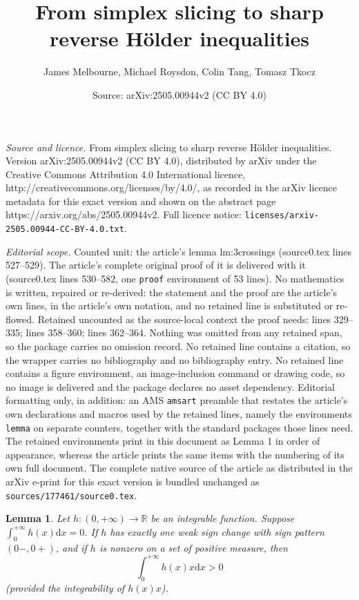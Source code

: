 \documentclass[10pt,a4paper]{amsart}
\title{From simplex slicing to sharp reverse H\"older inequalities}
\author{James Melbourne, Michael Roysdon, Colin Tang, Tomasz Tkocz}
\date{Source: arXiv:2505.00944v2 (CC BY 4.0)}
\newtheorem{lemma}{Lemma}
\newcommand{\R}{\mathbb{R}}
\newcommand{\dd}{\mathrm{d}}
\begin{document}
\maketitle

\noindent\emph{Source and licence.} From simplex slicing to sharp reverse H\"older inequalities. Version arXiv:2505.00944v2 (CC BY 4.0), distributed by arXiv under the Creative Commons Attribution 4.0 International licence, http://creativecommons.org/licenses/by/4.0/, as recorded in the arXiv licence metadata for this exact version and shown on the abstract page https://arxiv.org/abs/2505.00944v2. Full licence notice: \texttt{licenses/arxiv-2505.00944-CC-BY-4.0.txt}.\par\smallskip

\noindent\textit{Editorial scope.} Counted unit: the article's lemma lm:3crossings (source0.tex lines 527--529). The article's complete original proof of it is delivered with it (source0.tex lines 530--582, one \texttt{proof} environment of 53 lines). No mathematics is written, repaired or re-derived: the statement and the proof are the article's own lines, in the article's own notation, and no retained line is substituted or re-flowed.  Retained uncounted as the source-local context the proof needs: lines 329--335; lines 358--360; lines 362--364.  Nothing was omitted from any retained span, so the package carries no omission record.  No retained line contains a citation, so the wrapper carries no bibliography and no bibliography entry.  No retained line contains a figure environment, an image-inclusion command or drawing code, so no image is delivered and the package declares no asset dependency.  Editorial formatting only, in addition: an AMS \texttt{amsart} preamble that restates the article's own declarations and macros used by the retained lines, namely the environments \texttt{lemma} on separate counters, together with the standard packages those lines need.  The retained environments print in this document as Lemma 1 in order of appearance, whereas the article prints the same items with the numbering of its own full document.  The complete native source of the article as distributed in the arXiv e-print for this exact version is bundled unchanged as \texttt{sources/177461/source0.tex}.
\begin{lemma}\label{lm:simple-crossings}
Let $h \colon (0, +\infty) \to \R$ be an integrable function. Suppose $\int_0^{+\infty} h(x) \dd x = 0$. If  $h$ has exactly one weak sign change with sign pattern $(0-,0+)$, and if $h$ is nonzero on a set of positive measure, then
\[ 
\int_0^{+\infty} h(x)x \dd x > 0
 \]
(provided the integrability of $h(x)x$). 
\end{lemma}
\end{document}
